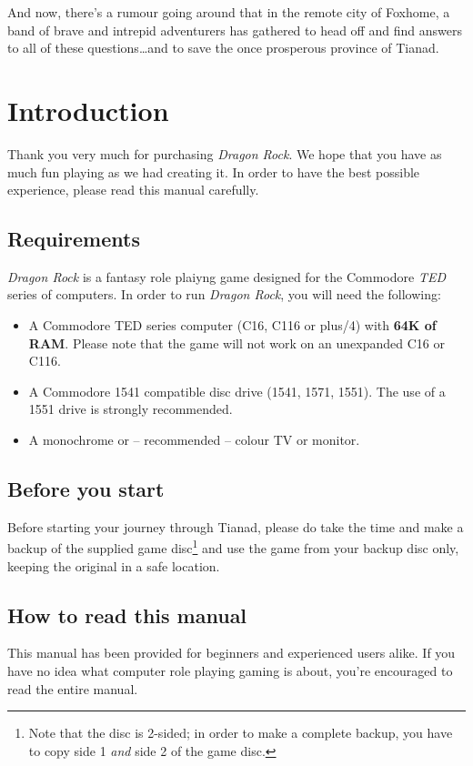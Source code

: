 \documentclass[12pt]{scrbook}
\begin{document}
And now, there's a rumour going around that in the remote city of Foxhome, a band of brave and intrepid adventurers has gathered to head off and find answers to all of these questions\dots and to save the once prosperous province of Tianad.

\chapter{Introduction}
Thank you very much for purchasing \textit{Dragon Rock}. We hope that you have as much fun playing as we had creating it. In order to have the best possible experience, please read this manual carefully.

\section*{Requirements}
\textit{Dragon Rock} is a fantasy role plaiyng game designed for the Commodore \textit{TED} series of computers. In order to run \textit{Dragon Rock}, you will need the following:
\begin{itemize}
    \item A Commodore TED series computer (C16, C116 or plus/4) with \textbf{64K of RAM}. Please note that the game will not work on an unexpanded C16 or C116.
    \item A Commodore 1541 compatible disc drive (1541, 1571, 1551). The use of a 1551 drive is strongly recommended.
    \item A monochrome or -- recommended -- colour TV or monitor.
\end{itemize}

\section*{Before you start}
Before starting your journey through Tianad, please do take the time and make a backup of the supplied game disc\footnote{Note that the disc is 2-sided; in order to make a complete backup, you have to copy side 1 \textit{and} side 2 of the game disc.} and use the game from your backup disc only, keeping the original in a safe location.

\section*{How to read this manual}
This manual has been provided for beginners and experienced users alike. If you have no idea what computer role playing gaming is about, you're encouraged to read the entire manual. 
\end{document}
